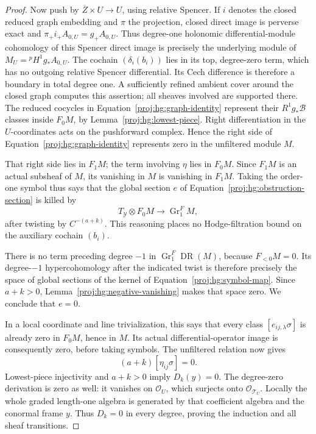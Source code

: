 \documentclass[11pt,letterpaper]{article}
\theoremstyle{definition}
\theoremstyle{remark}
\begin{document}
\begin{proof}
Now push by \(\overline Z\times U\to U\), using relative
Spencer.  If \(i\) denotes the closed reduced graph embedding and
\(\pi\) the projection, closed direct image is perverse exact and
\(\pi_+i_+A_{0,U}=g_+A_{0,U}\).  Thus degree-one holonomic
differential-module cohomology of this Spencer direct image is
precisely the underlying module of
\(M_U={}^{p}\!H^1g_*A_{0,U}\).
The cochain \((\delta_i(b_i))\) lies in its top,
degree-zero term, which has no outgoing relative Spencer
differential.  Its Cech difference is therefore a boundary in
total degree one.  A sufficiently refined ambient cover around
the closed graph computes this assertion; all sheaves involved
are supported there.  The reduced cocycles in
Equation~\eqref{proj:hg:graph-identity} represent their
\(R^1g_*\mathcal B\) classes inside \(F_0M\), by
Lemma~\ref{proj:hg:lowest-piece}.  Right differentiation in the
\(U\)-coordinates acts on the pushforward complex.
Hence the right side of Equation~\eqref{proj:hg:graph-identity}
represents zero in the unfiltered module \(M\).

That right side lies in \(F_1M\); the term involving \(\eta\)
lies in \(F_0M\).  Since \(F_1M\) is an actual subsheaf of \(M\),
its vanishing in \(M\) is vanishing in \(F_1M\).  Taking the
order-one symbol thus says that the global section \(e\) of
Equation~\eqref{proj:hg:obstruction-section} is killed by
\begin{equation}\label{proj:hg:symbol-map}
 T_{\mathcal Y}\otimes F_0M
           \longrightarrow \operatorname{Gr}^F_1M,
\end{equation}
after twisting by \(C^{-(a+k)}\).
This reasoning places no Hodge-filtration bound on the
auxiliary cochain \((b_i)\).

There is no term preceding degree \(-1\) in
\(\operatorname{Gr}^F_1\operatorname{DR}(M)\), because \(F_{<0}M=0\).  Its degree-\(-1\)
hypercohomology after the indicated twist is therefore precisely
the space of global sections of the kernel of
Equation~\eqref{proj:hg:symbol-map}.  Since \(a+k>0\),
Lemma~\ref{proj:hg:negative-vanishing} makes that space zero.
We conclude that \(e=0\).

In a local coordinate and line trivialization, this says that
every class \([e_{ij,\lambda}\sigma]\) is already zero in
\(F_0M\), hence in \(M\).  Its actual differential-operator image
is consequently zero, before taking symbols.  The unfiltered
relation now gives
\[
 (a+k)[\eta_{ij}\sigma]=0.
\]
Lowest-piece injectivity and \(a+k>0\) imply \(D_k(y)=0\).
The degree-zero derivation is zero as well: it vanishes on
\(\mathcal{O}_U\), which surjects onto \(\mathcal{O}_{\mathcal T_U}\).
Locally the whole graded length-one algebra is generated by
that coefficient algebra and the conormal frame \(y\).
Thus \(D_k=0\) in every degree, proving the induction and all
sheaf transitions.


\end{proof}
\end{document}

